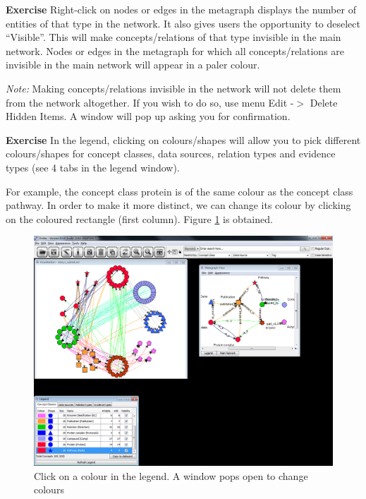 \exerciserule
\textbf{Exercise}
Right-click on nodes or edges in the metagraph displays the number of entities of that type in the network. 
It also gives users the opportunity to deselect ``Visible''. This will make concepts/relations of that type invisible in the main network. 
Nodes or edges in the metagraph for which all concepts/relations are invisible in the main network will appear in a paler colour.

\emph{Note:} Making concepts/relations invisible in the network will not delete them from the network altogether. 
If you wish to do so, use menu Edit -$>$ Delete Hidden Items. A window will pop up asking you for confirmation.

\exerciserule
\textbf{Exercise}
In the legend, clicking on colours/shapes will allow you to pick different colours/shapes for concept classes, 
data sources, relation types and evidence types (see 4 tabs in the legend window). 

For example, the concept class protein is of the same colour as the concept class pathway.
In order to make it more distinct, we can change its colour by clicking on the coloured rectangle (first column).
Figure \ref{fig:aracyc_click_colour} is obtained.
\begin{figure}[H]
\centering
\includegraphics[scale=0.3]{images/Jun12/aracyc_colour_CC_from_legend.png} 
\caption{Click on a colour in the legend. A window pops open to change colours}
\label{fig:aracyc_click_colour}
\end{figure}


